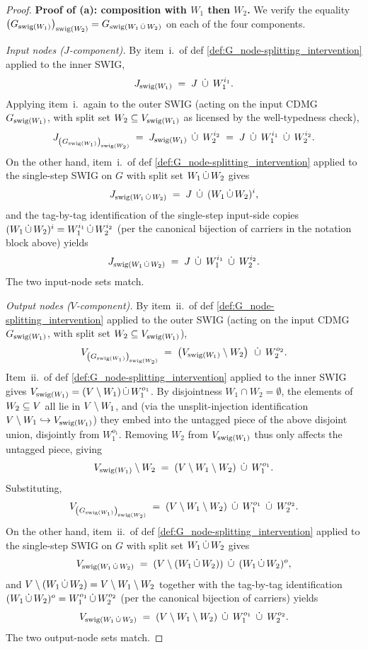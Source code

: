 \documentclass[main]{subfiles}
\begin{document}
\begin{proof}
\medskip\noindent\textbf{Proof of (a): composition with $W_1$ then $W_2$.}
We verify the equality $\left ( G_{\mathrm{swig}(W_1)} \right )_{\mathrm{swig}(W_2)} = G_{\mathrm{swig}(W_1 \,\dot{\cup}\, W_2)}$ on each of the four components.

\medskip\noindent\emph{Input nodes ($J$-component).}
By item~i.\ of def \ref{def:G_node-splitting_intervention} applied to the inner SWIG,
\[ J_{\mathrm{swig}(W_1)} \;=\; J \;\,\dot{\cup}\,\; W_1^{i_1}. \]
Applying item~i.\ again to the outer SWIG (acting on the input CDMG $G_{\mathrm{swig}(W_1)}$, with split set $W_2 \subseteq V_{\mathrm{swig}(W_1)}$ as licensed by the well-typedness check),
\[
    J_{\left ( G_{\mathrm{swig}(W_1)} \right )_{\mathrm{swig}(W_2)}} \;=\; J_{\mathrm{swig}(W_1)} \;\,\dot{\cup}\,\; W_2^{i_2} \;=\; J \;\,\dot{\cup}\,\; W_1^{i_1} \;\,\dot{\cup}\,\; W_2^{i_2}.
\]
On the other hand, item~i.\ of def \ref{def:G_node-splitting_intervention} applied to the single-step SWIG on $G$ with split set $W_1 \,\dot{\cup}\, W_2$ gives
\[ J_{\mathrm{swig}(W_1 \,\dot{\cup}\, W_2)} \;=\; J \;\,\dot{\cup}\,\; (W_1 \,\dot{\cup}\, W_2)^i, \]
and the tag-by-tag identification of the single-step input-side copies $(W_1 \,\dot{\cup}\, W_2)^i = W_1^{i_1} \,\dot{\cup}\, W_2^{i_2}$ (per the canonical bijection of carriers in the notation block above) yields
\[ J_{\mathrm{swig}(W_1 \,\dot{\cup}\, W_2)} \;=\; J \;\,\dot{\cup}\,\; W_1^{i_1} \;\,\dot{\cup}\,\; W_2^{i_2}. \]
The two input-node sets match. \checkmark

\medskip\noindent\emph{Output nodes ($V$-component).}
By item~ii.\ of def \ref{def:G_node-splitting_intervention} applied to the outer SWIG (acting on the input CDMG $G_{\mathrm{swig}(W_1)}$, with split set $W_2 \subseteq V_{\mathrm{swig}(W_1)}$),
\[ V_{\left ( G_{\mathrm{swig}(W_1)} \right )_{\mathrm{swig}(W_2)}} \;=\; \left ( V_{\mathrm{swig}(W_1)} \setminus W_2 \right ) \;\,\dot{\cup}\,\; W_2^{o_2}. \]
Item~ii.\ of def \ref{def:G_node-splitting_intervention} applied to the inner SWIG gives $V_{\mathrm{swig}(W_1)} = (V \setminus W_1) \,\dot{\cup}\, W_1^{o_1}$. By disjointness $W_1 \cap W_2 = \emptyset$, the elements of $W_2 \subseteq V$ all lie in $V \setminus W_1$, and (via the unsplit-injection identification $V \setminus W_1 \hookrightarrow V_{\mathrm{swig}(W_1)}$) they embed into the untagged piece of the above disjoint union, disjointly from $W_1^{o_1}$. Removing $W_2$ from $V_{\mathrm{swig}(W_1)}$ thus only affects the untagged piece, giving
\[ V_{\mathrm{swig}(W_1)} \setminus W_2 \;=\; (V \setminus W_1 \setminus W_2) \;\,\dot{\cup}\,\; W_1^{o_1}. \]
Substituting,
\[ V_{\left ( G_{\mathrm{swig}(W_1)} \right )_{\mathrm{swig}(W_2)}} \;=\; (V \setminus W_1 \setminus W_2) \;\,\dot{\cup}\,\; W_1^{o_1} \;\,\dot{\cup}\,\; W_2^{o_2}. \]
On the other hand, item~ii.\ of def \ref{def:G_node-splitting_intervention} applied to the single-step SWIG on $G$ with split set $W_1 \,\dot{\cup}\, W_2$ gives
\[ V_{\mathrm{swig}(W_1 \,\dot{\cup}\, W_2)} \;=\; (V \setminus (W_1 \,\dot{\cup}\, W_2)) \;\,\dot{\cup}\,\; (W_1 \,\dot{\cup}\, W_2)^o, \]
and $V \setminus (W_1 \,\dot{\cup}\, W_2) = V \setminus W_1 \setminus W_2$ together with the tag-by-tag identification $(W_1 \,\dot{\cup}\, W_2)^o = W_1^{o_1} \,\dot{\cup}\, W_2^{o_2}$ (per the canonical bijection of carriers) yields
\[ V_{\mathrm{swig}(W_1 \,\dot{\cup}\, W_2)} \;=\; (V \setminus W_1 \setminus W_2) \;\,\dot{\cup}\,\; W_1^{o_1} \;\,\dot{\cup}\,\; W_2^{o_2}. \]
The two output-node sets match. \checkmark


\end{proof}
\end{document}
